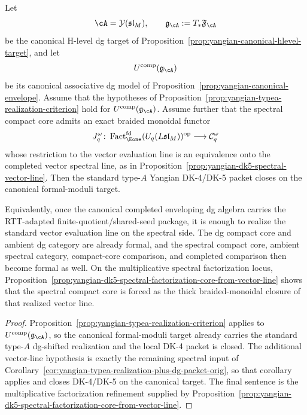 \begin{corollary}
\label{cor:yangian-canonical-realization-plus-vector-line-orig}
Let
\[
\cA=\mathcal{Y}(\mathfrak{sl}_M),
\qquad
\mathfrak{g}_{\cA}:=T_*\mathfrak{F}_{\cA}
\]
be the canonical H-level dg target of
Proposition~\ref{prop:yangian-canonical-hlevel-target}, and let
\[
U^{\mathrm{comp}}(\mathfrak{g}_{\cA})
\]
be its canonical associative dg model of
Proposition~\ref{prop:yangian-canonical-envelope}. Assume that the
hypotheses of Proposition~\ref{prop:yangian-typea-realization-criterion}
hold for \(U^{\mathrm{comp}}(\mathfrak{g}_{\cA})\). Assume further
that the spectral compact core admits an exact braided monoidal functor
\[
J_q^\omega\colon
\operatorname{Fact}_{\Eone}^{\mathrm{fd}}(U_q(L\mathfrak{sl}_M))^{\mathrm{op}}
\longrightarrow
\mathcal C_q^\omega
\]
whose restriction to the vector evaluation line is an equivalence onto
the completed vector spectral line, as in
Proposition~\ref{prop:yangian-dk5-spectral-vector-line}. Then the
standard type-$A$ Yangian DK-4/DK-5 packet closes on the canonical
formal-moduli target.

Equivalently, once the canonical completed enveloping dg algebra
carries the RTT-adapted finite-quotient/shared-seed package, it is
enough to realize the standard vector evaluation line on the spectral
side. The dg compact core and ambient dg category are already formal,
and the spectral compact core, ambient spectral category, compact-core
comparison, and completed comparison then become formal as well. On
the multiplicative spectral factorization locus,
Proposition~\ref{prop:yangian-dk5-spectral-factorization-core-from-vector-line}
shows that the spectral compact core is forced as the thick
braided-monoidal closure of that realized vector line.
\end{corollary}

\begin{proof}
Proposition~\ref{prop:yangian-typea-realization-criterion} applies to
\(U^{\mathrm{comp}}(\mathfrak{g}_{\cA})\), so the canonical
formal-moduli target already carries the standard type-$A$ dg-shifted
realization and the local DK-4 packet is closed. The additional
vector-line hypothesis is exactly the remaining spectral input of
Corollary~\ref{cor:yangian-typea-realization-plus-dg-packet-orig}, so that
corollary applies and closes DK-4/DK-5 on the canonical target. The
final sentence is the multiplicative factorization refinement supplied
by Proposition~\ref{prop:yangian-dk5-spectral-factorization-core-from-vector-line}.
\end{proof}
\fi

